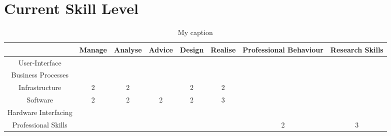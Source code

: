 \section{Current Skill Level}

\begin{table}[]
	\centering
	\caption{My caption}
	\label{my-label}
	\begin{tabular}{|c|c|c|c|c|c|c|c|}
		\hline
		& Manage & Analyse & Advice & Design & Realise & Professional Behaviour & Research Skills \\ \hline
		User-Interface       &        &         &        &        &         &                        &                 \\ \hline
		Business Processes   &        &         &        &        &         &                        &                 \\ \hline
		Infrastructure       & 2      & 2       &        & 2      & 2       &                        &                 \\ \hline
		Software             & 2      & 2       & 2      & 2      & 3       &                        &                 \\ \hline
		Hardware Interfacing &        &         &        &        &         &                        &                 \\ \hline
		Professional Skills  &        &         &        &        &         & 2                      & 3              \\ \hline
	\end{tabular}
\end{table}